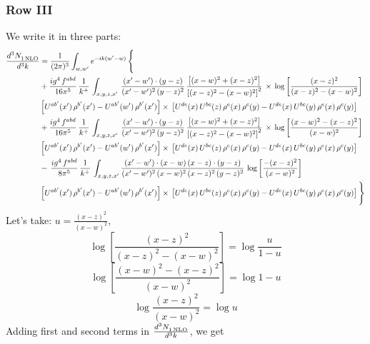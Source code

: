 \documentclass[9pt]{article}
\numberwithin{equation}{section}
\begin{document}
\subsubsection{Row III}
We write it in three parts:
\begin{align}
   \frac{d^{3}N_{1\,\rm NLO}^{\rm}}{d^{3}k}  & =  \frac{1}{(2\pi)^{3}}  \int_{w, w^\prime} e^{-ik(w^\prime-w)}\, \Bigg\{\notag \\
&  +\frac{ig^{4}\,f^{abd}}{16\pi^{5}}\, \frac{1}{k^{+}}\,\int_{x,y,z,x'}\, \frac{(x'-w')\cdot (y-z)}{(x'-w')^{2}\,(y-z)^{2}}\, \frac{\left[(x-w)^{2}+(x-z)^{2}\right]}{\left[(x-z)^{2}-(x-w)^{2}\right]^{2}}\, \times\, \log{\left[\frac{(x-z)^{2}}{(x-z)^{2}-(x-w)^{2}}\right]}\notag \\ & \left[U^{ab'}(x')\,\rho^{b'}(x')-U^{ab'}(w')\, \rho^{b'}(x')\right]\times\, \left[U^{de}(x)\,U^{bc}(z)\, \rho^{e}(x)\,\rho^{c}(y)-U^{de}(x)\,U^{bc}(y)\,\rho^{e}(x)\,\rho^{c}(y)\right] \notag \\
&  +\frac{ig^{4}\,f^{abd}}{16\pi^{5}}\, \frac{1}{k^{+}}\,\int_{x,y,z,x'}\, \frac{(x'-w')\cdot (y-z)}{(x'-w')^{2}\,(y-z)^{2}}\, \frac{\left[(x-w)^{2}+(x-z)^{2}\right]}{\left[(x-z)^{2}-(x-w)^{2}\right]^{2}}\, \times\, \log{\left[\frac{(x-w)^{2}-(x-z)^{2}}{(x-w)^{2}}\right]}\notag \\ & \left[U^{ab'}(x')\,\rho^{b'}(x')-U^{ab'}(w')\, \rho^{b'}(x')\right]\times\, \left[U^{de}(x)\,U^{bc}(z)\, \rho^{e}(x)\,\rho^{c}(y)-U^{de}(x)\,U^{bc}(y)\,\rho^{e}(x)\,\rho^{c}(y)\right] \notag \\
&-\, \frac{ig^{4}\,f^{abd}}{8\pi^{5}}\,\frac{1}{k^{+}}\,\int_{x,y,z,x'}\frac{(x'-w')\cdot (x-w)\, (x-z)\cdot (y-z)}{(x'-w')^{2}\, (x-w)^{2}\, (x-z)^{2}\, (y-z)^{2}}\,\log{\left[\frac{-(x-z)^{2}}{(x-w)^{2}}\right]} \notag \\ & \left[U^{ab'}(x')\,\rho^{b'}(x')-U^{ab'}(w')\, \rho^{b'}(x')\right]\times\, \left[U^{de}(x)\,U^{bc}(z)\, \rho^{e}(x)\,\rho^{c}(y)-U^{de}(x)\,U^{bc}(y)\,\rho^{e}(x)\,\rho^{c}(y)\right]\Bigg\}
\end{align}
Let's take: $u = \frac{(x-z)^{2}}{(x-w)^{2}}$,
$$ \log{\left[\frac{(x-z)^{2}}{(x-z)^{2}-(x-w)^{2}}\right]} = \log{\frac{u}{1-u}} $$
$$\log{\left[\frac{(x-w)^{2}-(x-z)^{2}}{(x-w)^{2}}\right]} = \log{1-u}$$
$$\log{\frac{(x-z)^{2}}{(x-w)^{2}}} = \log{u}$$
Adding first and second terms in $ \frac{d^{3}N_{1\,\rm NLO}^{\rm}}{d^{3}k} $, we get
\end{document}
